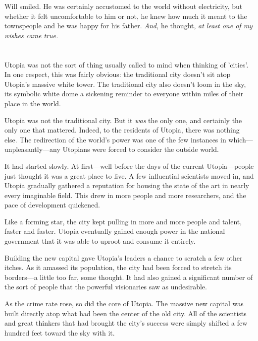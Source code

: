 \documentclass[12pt,letterpaper,oneside,english]{book}
\begin{document}
Will smiled. He was certainly accustomed to the world without electricity,
but whether it felt uncomfortable to him or not, he knew how much it meant
to the townspeople and he was happy for his father. \textit{And,} he
thought, \textit{at least one of my wishes came true.}


\chapter{} %

Utopia was not the sort of thing usually called to mind when thinking of
'cities'.  In one respect, this was fairly obvious: the traditional city
doesn't sit atop Utopia's massive white tower.  The traditional city
also doesn't loom in the sky, its symbolic white dome a sickening
reminder to everyone within miles of their place in the world.

Utopia was not the traditional city.  But it \emph{was} the only one,
and certainly the only one that mattered.  Indeed, to the residents of
Utopia, there was nothing else.  The redirection of the world's power
was one of the few instances in which---unpleasantly---any Utopians were
forced to consider the outside world.

It had started slowly.  At first---well before the days of the current
Utopia---people just thought it was a great place to live.  A few
influential scientists moved in, and Utopia gradually gathered a
reputation for housing the state of the art in nearly every imaginable
field.  This drew in more people and more researchers, and the pace of
development quickened.

Like a forming star, the city kept pulling in more and more people and
talent, faster and faster.  Utopia eventually gained enough power in the
national government that it was able to uproot and consume it entirely.

Building the new capital gave Utopia's leaders a chance to scratch a few
other itches.  As it amassed its population, the city had been forced to
stretch its borders---a little too far, some thought.  It had also
gained a significant number of the sort of people that the powerful
visionaries saw as undesirable.

As the crime rate rose, so did the core of Utopia.  The massive new
capital was built directly atop what had been the center of the old
city.  All of the scientists and great thinkers that had brought the
city's success were simply shifted a few hundred feet toward the sky
with it.
\end{document}
